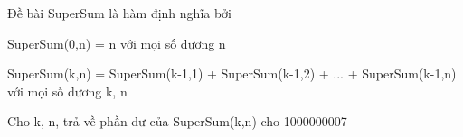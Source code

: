Đề bài
SuperSum là hàm định nghĩa bởi  

   SuperSum(0,n) = n với mọi số dương n  

   SuperSum(k,n) = SuperSum(k-1,1) + SuperSum(k-1,2) + ... + SuperSum(k-1,n) với mọi số dương k, n  

   Cho k, n, trả về phần dư của SuperSum(k,n) cho 1000000007